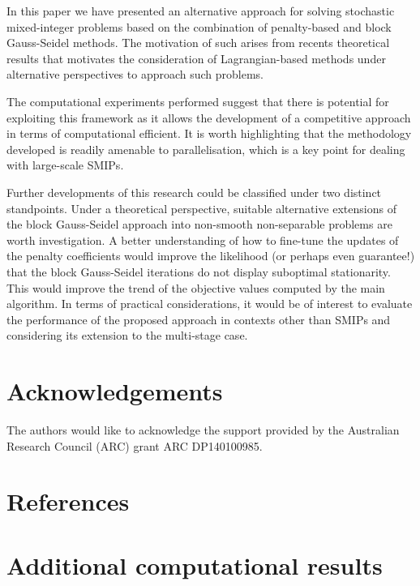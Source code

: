 \documentclass[preprint, 1p, review]{elsarticle}
\begin{document}
In this paper we have presented an alternative approach for solving stochastic mixed-integer problems based on the combination of penalty-based and block Gauss-Seidel methods. The motivation of such arises from recents theoretical results that motivates the consideration of Lagrangian-based methods under alternative perspectives to approach such problems. 

The computational experiments performed suggest that there is potential for exploiting this framework as it allows the development of a competitive approach in terms of computational efficient. It is worth highlighting that the methodology developed is readily amenable to parallelisation, which is a key point for dealing with large-scale SMIPs.

Further developments of this research could be classified under two distinct standpoints. Under a theoretical perspective, suitable alternative extensions of the block Gauss-Seidel approach into non-smooth non-separable problems are worth investigation. 
A better understanding of how to fine-tune the updates of the penalty coefficients would improve the likelihood (or perhaps even guarantee!) that the block Gauss-Seidel iterations do not display suboptimal stationarity. This would improve the trend of the objective values computed by the main algorithm.
In terms of practical considerations, it would be of interest to evaluate the performance of the proposed approach in contexts other than SMIPs and considering its extension to the multi-stage case.

\section*{Acknowledgements} \label{sec6}
The authors would like to acknowledge the support provided by the Australian Research Council (ARC) grant ARC DP140100985.



\section*{References}



 
\pagebreak 
 
\appendix
\section{Additional computational results} \label{app}
\end{document}
